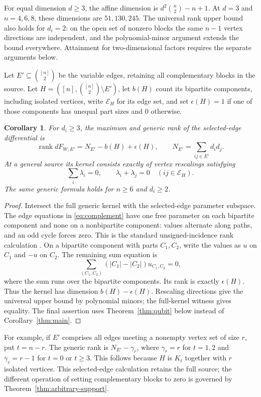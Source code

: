 \documentclass[11pt]{article}
\newtheorem{corollary}[theorem]{Corollary}
\theoremstyle{remark}\newtheorem{remark}[theorem]{Remark}
\DeclareMathOperator{\rank}{rank}
\begin{document}
For equal dimension $d\geq3$, the affine dimension is $d^2\binom n2-n+1$. At $d=3$ and $n=4,6,8$, these dimensions are $51,130,245$. The universal rank upper bound also holds for $d_i=2$: on the open set of nonzero blocks the same $n-1$ vertex directions are independent, and the polynomial-minor argument extends the bound everywhere. Attainment for two-dimensional factors requires the separate arguments below.

Let $E'\subseteq\binom{[n]}2$ be the variable edges, retaining all complementary blocks in the source. Let $H=([n],\binom{[n]}2\setminus E')$, let $b(H)$ count its bipartite components, including isolated vertices, write $\mathcal E_H$ for its edge set, and set $\epsilon(H)=1$ if one of those components has unequal part sizes and $0$ otherwise.
\begin{corollary}\label{thm:edges}
For $d_i\geq3$, the maximum and generic rank of the selected-edge differential is
\[
 \rank dF_{W,E'}=N_{E'}-b(H)+\epsilon(H),\qquad
 N_{E'}=\sum_{ij\in E'}d_id_j.
\]
At a general source its kernel consists exactly of vertex rescalings satisfying
\begin{equation}\label{eq:complement}
 \sum_i\lambda_i=0,\qquad \lambda_i+\lambda_j=0\quad(ij\in\mathcal E_H).
\end{equation}
The same generic formula holds for $n\geq6$ and $d_i\geq2$.
\end{corollary}
\begin{proof}
Intersect the full generic kernel with the selected-edge parameter subspace. The edge equations in \eqref{eq:complement} have one free parameter on each bipartite component and none on a nonbipartite component: values alternate along paths, and an odd cycle forces zero. This is the standard unsigned-incidence rank calculation \cite[Theorem 8.2.1]{godsil}. On a bipartite component with parts $C_1,C_2$, write the values as $u$ on $C_1$ and $-u$ on $C_2$. The remaining sum equation is
\[
 \sum_{(C_1,C_2)}(|C_1|-|C_2|)u_{C_1,C_2}=0,
\]
where the sum runs over the bipartite components. Its rank is exactly $\epsilon(H)$. Thus the kernel has dimension $b(H)-\epsilon(H)$. Rescaling directions give the universal upper bound by polynomial minors; the full-kernel witness gives equality. The final assertion uses Theorem~\ref{thm:qubit} below instead of Corollary~\ref{thm:main}.
\end{proof}

For example, if $E'$ comprises all edges meeting a nonempty vertex set of size $r$, put $t=n-r$. The generic rank is $N_{E'}-\gamma_r$, where $\gamma_r=r$ for $t=1,2$ and $\gamma_r=r-1$ for $t=0$ or $t\geq3$. This follows because $H$ is $K_t$ together with $r$ isolated vertices. This selected-edge calculation retains the full source; the different operation of setting complementary blocks to zero is governed by Theorem~\ref{thm:arbitrary-support}.
\end{document}
